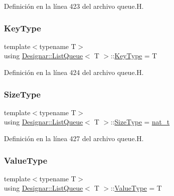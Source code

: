 Definición en la línea 423 del archivo queue.\+H.

\mbox{\label{class_designar_1_1_list_queue_abb867bba1fa9e40a4bbc27160e5148c5}} 
\subsubsection{\texorpdfstring{Key\+Type}{KeyType}}
{\footnotesize\ttfamily template$<$typename T$>$ \\
using \hyperlink{class_designar_1_1_list_queue}{Designar\+::\+List\+Queue}$<$ T $>$\+::\hyperlink{class_designar_1_1_s_l_list_a0f9ac3eaee2d1a9e6091aaaac825ccb2}{Key\+Type} =  T}



Definición en la línea 424 del archivo queue.\+H.

\mbox{\label{class_designar_1_1_list_queue_a506b74cc71e3d3ad8767ad393b4704b6}} 
\subsubsection{\texorpdfstring{Size\+Type}{SizeType}}
{\footnotesize\ttfamily template$<$typename T$>$ \\
using \hyperlink{class_designar_1_1_list_queue}{Designar\+::\+List\+Queue}$<$ T $>$\+::\hyperlink{class_designar_1_1_s_l_list_a253792b5e9c19ea61fb49e5e83f6159b}{Size\+Type} =  \hyperlink{namespace_designar_aa72662848b9f4815e7bf31a7cf3e33d1}{nat\+\_\+t}}



Definición en la línea 427 del archivo queue.\+H.

\mbox{\label{class_designar_1_1_list_queue_aa5dc35fd7e235c69f4473a96eaae2de3}} 
\subsubsection{\texorpdfstring{Value\+Type}{ValueType}}
{\footnotesize\ttfamily template$<$typename T$>$ \\
using \hyperlink{class_designar_1_1_list_queue}{Designar\+::\+List\+Queue}$<$ T $>$\+::\hyperlink{class_designar_1_1_s_l_list_a22813e78b0dea3a55f47d5f476fd99a1}{Value\+Type} =  T}



